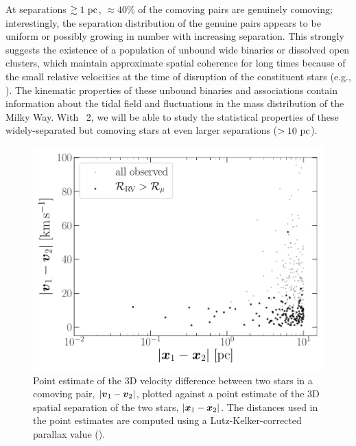 \documentclass[modern, letterpaper]{aastex61}
\newcommand{\gaia}{\project{Gaia}}
\newcommand{\DR}[1]{\acronym{DR}#1}
\begin{document}
At separations $\gtrsim 1~\mathrm{pc}$, $\approx 40\%$ of the comoving pairs are
genuinely comoving; interestingly, the separation distribution of the genuine
pairs appears to be uniform or possibly growing in number with increasing
separation.
This strongly suggests the existence of a population of unbound wide binaries or
dissolved open clusters, which maintain approximate spatial coherence for long
times because of the small relative velocities at the time of disruption of the
constituent stars (e.g., \citealt{Jiang:2010}).
The kinematic properties of these unbound binaries and associations contain
information about the tidal field and fluctuations in the mass distribution of
the Milky Way.
With \gaia\ \DR{2}, we will be able to study the statistical properties of these
widely-separated but comoving stars at even larger separations ($>10~\mathrm{pc}$).

\begin{figure}[htbp]
  \begin{center}
    \includegraphics[width=\linewidth]{dx-dv.pdf}
  \end{center}
  \caption{%
    Point estimate of the 3D velocity difference between two stars in a comoving
    pair, $|\boldsymbol{v}_1 - \boldsymbol{v}_2|$, plotted against a point estimate of the 3D
    spatial separation of the two stars, $|\boldsymbol{x}_1 - \boldsymbol{x}_2|$.
    The distances used in the point estimates are computed using a
    Lutz-Kelker-corrected parallax value (\citealt{Lutz:1973}).
    \label{fig:dx-dv}}
\end{figure}
\end{document}
